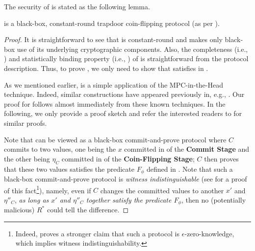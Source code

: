  The security of  is stated as the following lemma.
\begin{lemma}\label{lem:td-cf}
 is a black-box, constant-round trapdoor coin-flipping protocol (as per ).
\end{lemma}
\begin{proof}


It is straightforward to see that  is constant-round and makes only black-box use of its underlying cryptographic components. Also, the completeness (i.e., ) and statistically binding property (i.e., ) of  is straightforward from the protocol description. Thus, to prove , we only need to show that  satisfies  in .

As we mentioned earlier,  is a simple application of the MPC-in-the-Head technique. Indeed, similar constructions have appeared previously in, e.g., \cite{FOCS:GLOV12,C:CCLY22}. Our proof for  follows almost immediately from these known techniques. In the following, we only provide a proof sketch and refer the interested readers to \cite[Section 6.5]{C:CCLY22} for similar proofs.

 Note that  can be viewed as a black-box commit-and-prove protocol where $C$ commits to two values, one being the $x$ committed in  of the {\bf Commit Stage} and the other being $\eta_C$ committed in  of the {\bf Coin-Flipping Stage}; $C$ then proves that these two values satisfies the predicate $F_\phi$ defined in . Note that such a black-box commit-and-prove protocol is {\em witness indistinguishable} (see \cite[Section 6.5]{C:CCLY22} for a proof of this fact\footnote{Indeed, \cite[Section 6.5]{C:CCLY22} proves a stronger claim that such a protocol is $\epsilon$-zero-knowledge, which implies witness indistinguishability.}), namely, even if $C$ changes the committed values to another $x'$ and $\eta''_C$, {\em as long as $x'$ and $\eta''_C$ together satisfy the predicate $F_\phi$}, then no (potentially malicious) $R^*$ could tell the difference.


\end{proof}

